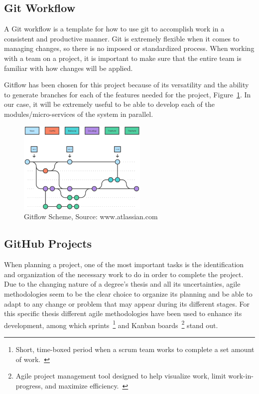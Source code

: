 \subsection{Git Workflow}

A Git workflow is a template for how to use git to accomplish work in a consistent and productive manner. Git is extremely flexible when it comes to managing changes, so there is no imposed or standardized process. When working with a team on a project, it is important to make sure that the entire team is familiar with how changes will be applied. 

Gitflow has been chosen for this project because of its versatility and the ability to generate branches for each of the features needed for the project, Figure~\ref{fig:gitflow-example}. In our case, it will be extremely useful to be able to develop each of the modules/micro-services of the system in parallel.

\begin{figure}[H]
    \centering
    \includegraphics[width=0.55\textwidth]{figures/gitflow.png}
    \caption{Gitflow Scheme, Source: www.atlassian.com~\cite{gitflow}}
    \label{fig:gitflow-example}
\end{figure}

\subsection{GitHub Projects}

When planning a project, one of the most important tasks is the identification and organization of the necessary work to do in order to complete the project. Due to the changing nature of a degree's thesis and all its uncertainties, agile methodologies seem to be the clear choice to organize its planning and be able to adapt to any change or problem that may appear during its different stages. For this specific thesis different agile methodologies have been used to enhance its development, among which sprints~\footnote{Short, time-boxed period when a scrum team works to complete a set amount of work.~\cite{sprintsDef}} and \gls{Kanban} boards~\footnote{Agile project management tool designed to help visualize work, limit work-in-progress, and maximize efficiency.~\cite{kanbanDef}} stand out.

